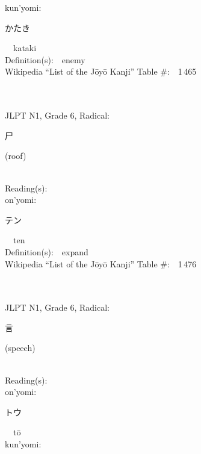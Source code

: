 \begin{multicols}{2}
{\hspace*{1em}}kun'yomi:\ \ \\
{\hspace*{2em}}{\begin{CJK}{UTF8}{min} かたき \end{CJK}}\ \ kataki\ \ \\
Definition(s):\ \ enemy \\
Wikipedia ``List of the J\=oy\=o Kanji'' Table \#:\ \ 1\,465 \\
\ \ \\
{\fontsize{34pt}{40pt}  }\ \ \\  %
{JLPT N1, Grade 6, Radical:\ \ {\begin{CJK}{UTF8}{min} 尸 \end{CJK}} (roof) } \\
Reading(s):\ \ \\
{\hspace*{1em}}on'yomi:\ \ \\
{\hspace*{2em}}{\begin{CJK}{UTF8}{min} テン \end{CJK}}\ \ ten\ \ \\
Definition(s):\ \ expand \\
Wikipedia ``List of the J\=oy\=o Kanji'' Table \#:\ \ 1\,476 \\
\ \ \\
{\fontsize{34pt}{40pt}  }\ \ \\  %
{JLPT N1, Grade 6, Radical:\ \ {\begin{CJK}{UTF8}{min} 言 \end{CJK}} (speech) } \\
Reading(s):\ \ \\
{\hspace*{1em}}on'yomi:\ \ \\
{\hspace*{2em}}{\begin{CJK}{UTF8}{min} トウ \end{CJK}}\ \ t\=o\ \ \\
{\hspace*{1em}}kun'yomi:\ \ \\

\end{multicols}
